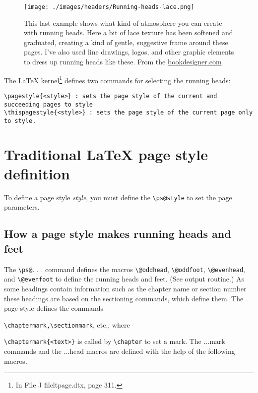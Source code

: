 \begin{figure}[hbt]
\texttt{[image: ./images/headers/Running-heads-lace.png]}
\caption{This last example shows what kind of atmosphere you can create with running heads. Here a bit of lace texture has been softened and graduated, creating a kind of gentle, suggestive frame around these pages. I’ve also used line drawings, logos, and other graphic elements to dress up running heads like these. From the \protect\href{bookk  }{bookdesigner.com}}
\end{figure}


The LaTeX kernel\footnote{In File J file{ltpage.dtx}, page 311.} defines two commands for selecting the running heads:

\begin{lstlisting}
\pagestyle{<style>} : sets the page style of the current and succeeding pages to style
\thispagestyle{<style>} : sets the page style of the current page only to style.
\end{lstlisting}

\section{Traditional LaTeX page style definition}

To define a page style \textit{style}, you must define the \lstinline{\ps@style} to set the page parameters.

\subsection{How a page style makes running heads and feet}
The \lstinline{\ps@}. . . command defines the macros \lstinline{\@oddhead}, \lstinline{\@oddfoot}, \lstinline{\@evenhead},
and \lstinline{\@evenfoot} to define the running heads and feet. (See output routine.) As some headings contain information such as the chapter name or section number these
headings are based on the sectioning commands, which define them. The page style defines the commands




\verb!\chaptermark,\sectionmark!, etc., where

\verb+\chaptermark{<text>}+ is called by \verb+\chapter+ to set a mark. The  ...mark commands and the ...head
macros are defined with the help of the following macros.



